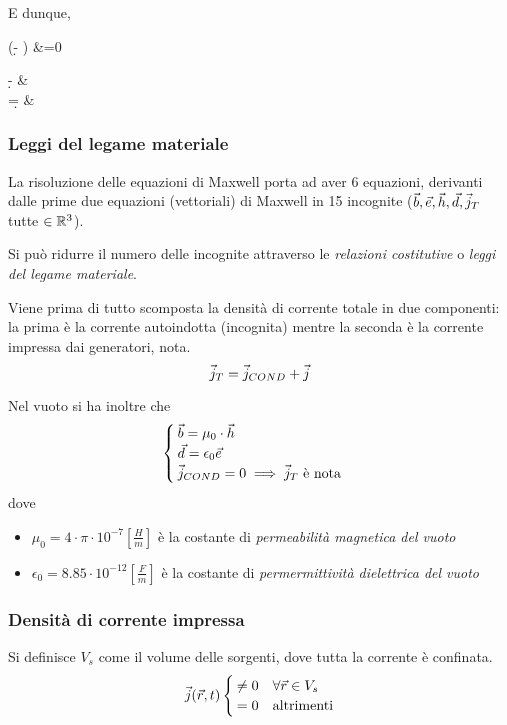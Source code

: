 E dunque,
\begin{esp}
	 \left(\diverg \d - \rho \right) &=0 \implies
	\begin{cases}
		\diverg \d - \rho &  \\
		\diverg \d = \rho & 
	\end{cases}
\end{esp}
\subsubsection{Leggi del legame materiale}
La risoluzione delle equazioni di Maxwell porta ad aver 6 equazioni, derivanti dalle prime due equazioni (vettoriali) di Maxwell in 15 incognite ($\vec{b} , \vec{e} , \vec{h} , \vec{d} , \vec{j}_T $ tutte $\in \mathbb{R}^3$).

Si può ridurre il numero delle incognite attraverso le \emph{relazioni costitutive} o \emph{leggi del legame materiale}.

Viene prima di tutto scomposta la densità di corrente totale in due componenti: la prima è la corrente autoindotta (incognita) mentre la seconda è la corrente impressa dai generatori, nota.
\begin{equation}
	\vec{j}_T = \vec{j}_{COND} + \vec{j}
\end{equation}

Nel vuoto si ha inoltre che
\begin{equation}
	\begin{cases}
		\vec{b} = \mu_0 \cdot \vec{h} \\
		\vec{d} = \epsilon_0 \vec{e} \\
		\vec{j}_{COND} = 0 \implies \vec{j}_T \text{ è nota} \\
	\end{cases}
	\label{eq:bh-de-j}
\end{equation}
dove
\begin{itemize}
	\item $\mu_0 = 4\cdot \pi \cdot 10^{-7} \left[\frac{H}{m}\right]$ è la costante di \emph{permeabilità
	magnetica del vuoto}
	\item $\epsilon_0 = 8.85 \cdot 10^{-12} \left[\frac{F}{m}\right]$ è la costante di \emph{permermittività
	dielettrica del vuoto}
\end{itemize}

\subsubsection{Densità di corrente impressa}
Si definisce $V_s$ come il volume delle sorgenti, dove tutta la corrente è confinata.
\begin{equation} \vec{j}(\vec{r},t)
	\begin{cases}
		\neq 0 & \forall \vec{r} \in V_s \\
		=0 & \text{altrimenti}
	\end{cases}
	\label{eq:correnti}
\end{equation}

